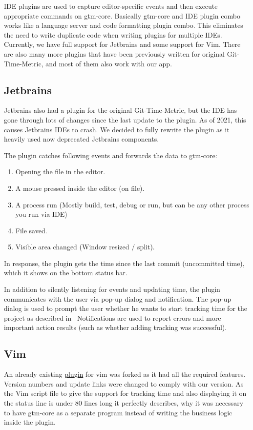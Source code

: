 IDE plugins are used to capture editor-specific events and then execute appropriate commands on gtm-core.
Basically gtm-core and IDE plugin combo works like a language server and code formatting plugin combo.
This eliminates the need to write duplicate code when writing plugins for multiple IDEs.
Currently, we have full support for Jetbrains and some support for Vim.
There are also many more plugins that have been previously written for original Git-Time-Metric, and most of them also work with our app.

\subsection{Jetbrains}\label{subsec:jetbrains-plugin}
Jetbrains also had a plugin for the original Git-Time-Metric, but the IDE has gone through lots of changes since the last update to the plugin.
As of 2021, this causes Jetbrains IDEs to crash.
We decided to fully rewrite the plugin as it heavily used now deprecated Jetbrains components.

The plugin catches following events and forwards the data to gtm-core:
\begin{enumerate}
    \item Opening the file in the editor.
    \item A mouse pressed inside the editor (on file).
    \item A process run (Mostly build, test, debug or run, but can be any other process you run via IDE)
    \item File saved.
    \item Visible area changed (Window resized / split).
\end{enumerate}

In response, the plugin gets the time since the last commit (uncommitted time), which it shows on the bottom status bar.

In addition to silently listening for events and updating time, the plugin communicates with the user via pop-up dialog and notification.
The pop-up dialog is used to prompt the user whether he wants to start tracking time for the project as described in~
Notifications are used to report errors and more important action results (such as whether adding tracking was successful).

\subsection{Vim}\label{subsec:vim-plugin}
An already existing \href{https://github.com/git-time-metric/gtm-vim-plugin}{plugin} for vim was forked as it had all the required features.
Version numbers and update links were changed to comply with our version.
As the Vim script file to give the support for tracking time and also displaying it on the status line is under 80 lines long
it perfectly describes, why it was necessary to have gtm-core as a separate program instead of writing the business logic inside the plugin.


